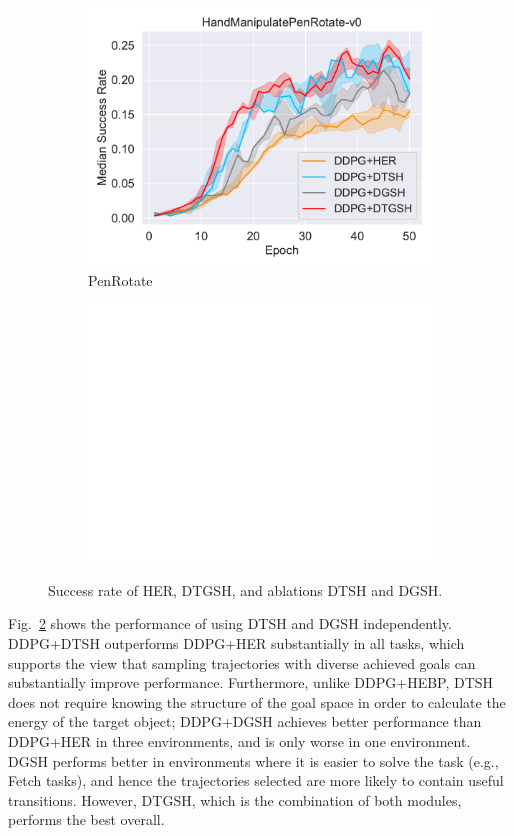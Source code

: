 \begin{figure}[h]
\begin{subfigure}[t]{0.33\textwidth}
    \includegraphics[width=\textwidth]{figures/chapter4/HandManipulatePenRotate-v0_ab1.pdf}
    \caption{PenRotate}
    \label{subfig:baseline_handpen_ab1}
  \end{subfigure}\hfill
  \begin{subfigure}[t]{0.33\textwidth}
    \includegraphics[width=\textwidth]{figures/chapter4/blank.png}
  \end{subfigure}\hfill
  \caption{Success rate of HER, DTGSH, and ablations DTSH and DGSH.} 
  \label{fig:ablation1}
\end{figure}

Fig.~\ref{fig:ablation1} shows the performance of using DTSH and DGSH independently. DDPG+DTSH outperforms DDPG+HER substantially in all tasks, which supports the view that sampling trajectories with diverse achieved goals can substantially improve performance. Furthermore, unlike DDPG+HEBP, DTSH does not require knowing the structure of the goal space in order to calculate the energy of the target object; DDPG+DGSH achieves better performance than DDPG+HER in three environments, and is only worse in one environment. DGSH performs better in environments where it is easier to solve the task (e.g., Fetch tasks), and hence the trajectories selected are more likely to contain useful transitions. However, DTGSH, which is the combination of both modules, performs the best overall.

